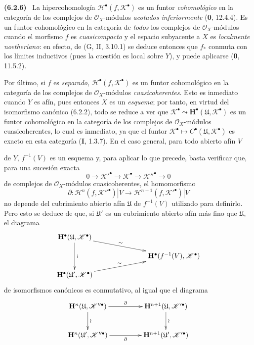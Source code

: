 \documentclass[10pt,oneside]{book}
\newcommand{\oldpage}[2][]{\setcounter{footnote}{0}\marginpar{\scriptsize\textbf{#1}~|~#2}\ignorespaces}
\newenvironment{env}[1][]{\par\medskip\noindent\textbf{(#1)}\ }{\par}
\begin{document}
\begin{env}[6.2.6]
La hipercohomología $\mathscr H^\bullet(f,\mathscr K^\bullet)$ es un funtor
\emph{cohomológico} en la categoría de los complejos de $\mathscr O_X$-módulos
\emph{acotados inferiormente} (\textbf 0, 12.4.4). Es un funtor cohomológico en la categoría
de \emph{todos} los complejos de $\mathscr O_X$-módulos cuando el morfismo $f$ es
\emph{cuasicompacto} y el espacio subyacente a $X$ es \emph{localmente noetheriano}: en
efecto, de (G, II, 3.10.1) se deduce entonces que $f_*$ conmuta con los límites
inductivos (pues la cuestión es local sobre $Y$), y puede aplicarse
(\textbf 0, 11.5.2).

Por último, si $f$ es \emph{separado}, $\mathscr H^\bullet(f,\mathscr K^\bullet)$ es
un funtor cohomológico en la categoría de los complejos de
$\mathscr O_X$-módulos \emph{cuasicoherentes}. Esto es inmediato cuando $Y$ es
afín, pues entonces $X$ es un \emph{esquema}; por tanto, en virtud del isomorfismo
canónico (6.2.2), todo se reduce a ver que
$\mathscr K^\bullet\leadsto\mathbf H^\bullet(\mathfrak U,\mathscr K^\bullet)$
es un funtor cohomológico en la categoría de los complejos de
$\mathscr O_X$-módulos cuasicoherentes, lo cual es inmediato, ya que el
funtor $\mathscr K^\bullet\mapsto
C^\bullet(\mathfrak U,\mathscr K^\bullet)$ es exacto en esta categoría
(\textbf I, 1.3.7). En el caso general, para todo abierto afín $V$

\oldpage[III]{141}

de $Y$, $f^{-1}(V)$ es un esquema y, para aplicar lo que precede, basta
verificar que, para una sucesión exacta
\[
  0\longrightarrow\mathscr K'^\bullet
  \longrightarrow\mathscr K^\bullet
  \longrightarrow\mathscr K''^\bullet
  \longrightarrow0
\]
de complejos de $\mathscr O_X$-módulos cuasicoherentes, el homomorfismo
\[
  \partial:
  \mathscr H^n(f,\mathscr K''^\bullet)|V
  \longrightarrow
  \mathscr H^{n+1}(f,\mathscr K'^\bullet)|V
\]
no depende del cubrimiento abierto afín $\mathfrak U$ de $f^{-1}(V)$ utilizado
para definirlo. Pero esto se deduce de que, si $\mathfrak U'$ es un
cubrimiento abierto afín más fino que $\mathfrak U$, el diagrama
\[
  \xymatrix@C=34pt@R=11pt{
    \mathbf H^\bullet(\mathfrak U,\mathscr K^\bullet)
      \ar[rrd]^-{\sim}\ar[dd]^{\wr}
    && \\
    &&
    \mathbf H^\bullet(f^{-1}(V),\mathscr K^\bullet)
    \\
    \mathbf H^\bullet(\mathfrak U',\mathscr K^\bullet)
      \ar[rru]^-{\sim}
    &&
  }
\]
de isomorfismos canónicos es conmutativo, al igual que el diagrama
\[
  \xymatrix@C=46pt@R=25pt{
    \mathbf H^n(\mathfrak U,\mathscr K''^\bullet)
      \ar[r]^-{\partial}\ar[d]^{\wr}
    &
    \mathbf H^{n+1}(\mathfrak U,\mathscr K'^\bullet)
      \ar[d]^{\wr}
    \\
    \mathbf H^n(\mathfrak U',\mathscr K''^\bullet)
      \ar[r]_-{\partial}
    &
    \mathbf H^{n+1}(\mathfrak U',\mathscr K'^\bullet)
  }
\]


\end{env}
\end{document}
